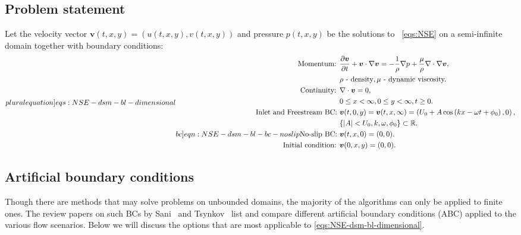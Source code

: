 \documentclass{article}
\begin{document}
\subsection{Problem statement}\label{subsec:problem-statement-dimentional}
Let the velocity vector $\boldsymbol{v}(t,x,y)=(u(t,x,y),v(t,x,y))$ and pressure $p(t,x,y)$ be the solutions to ~\cref{eqs:NSE} on a semi-infinite domain together with boundary conditions:
\begin{subequations}
\label[pluralequation]{eqs:NSE-dsm-bl-dimensional}
\begin{align}
\label{eqn:momentum-dimensional}
\text{Momentum: }	&\frac{\partial \boldsymbol{v}}{\partial t} + \boldsymbol{v} \cdot \nabla \boldsymbol{v} = -\frac{1}{\rho}\nabla p + {\frac{\mu}{\rho}} \nabla \cdot \nabla \boldsymbol{v},\\
&\rho\text{ - density}, \mu\text{ - dynamic viscosity.}\notag\\
\label{eqn:continuity-dsm-bl}
\text{Continuity: }	& \nabla \cdot \boldsymbol{v} = 0, \\ 
					&0\leq x < \infty, 0\leq y <\infty, t\geq0.\notag\\
\label{eqn:NSE-dsm-bl-bc-freestream}
\text{Inlet and Freestream BC: } 	& \boldsymbol{v}(t,0,y)=\boldsymbol{v}(t,x,\infty)=\left(U_0 + A\cos\left( kx -\omega t + \phi_0 \right),0\right),\\
									& \{|A|<U_0,k,\omega, \phi_0\}\subset \mathbb{R}.\notag\\
\label[bc]{eqn:NSE-dsm-bl-bc-noslip}
\text{No-slip BC: } & \boldsymbol{v}(t,x,0)=(0,0). \\
\text{Initial condition: } &\boldsymbol{v}(0,x,y)=(0,0).
\end{align}
\end{subequations}

\subsection{Artificial boundary conditions}\label{sec:artificial-bc}
Though there are methods that may solve problems on unbounded domains, the majority of the algorithms can only be applied to finite ones. 
The review papers on such BCs by Sani~\cite{Sani:1994} and Tsynkov~\cite{Tsynkov:1998} list and compare different artificial boundary conditions (ABC) applied to the various flow scenarios. Below we will discuss the options that are most applicable to \cref{eqs:NSE-dsm-bl-dimensional}. 
\end{document}

